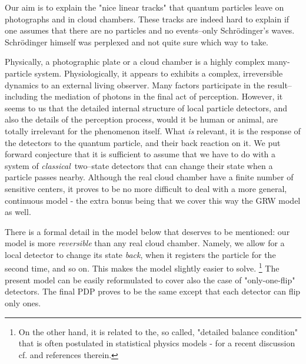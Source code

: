 \documentclass[12pt]{article}
\begin{document}
Our aim is to explain the "nice linear tracks" that quantum particles leave
on photographs and in cloud chambers. These tracks are indeed hard to
explain if one assumes that there are no particles and no events--only
Schr\"odinger's waves. Schr\"odinger himself was perplexed and not quite
sure which way to take.

Physically, a photographic plate or a cloud chamber is a highly complex
many-particle system. Physiologically, it appears to exhibits a complex,
irreversible dynamics to an external living observer. Many factors
participate in the result--including the mediation of photons in the
final act of perception. However, it seems to us that the detailed internal
structure of local particle detectors, and also the details of the
perception process, would it be human or animal, are totally irrelevant for
the phenomenon itself. What {\sl is} relevant, it is the response of the
detectors to the quantum particle, and their back reaction on it. We put
forward conjecture that it is sufficient to assume that we have to do with
a system of {\sl classical}\, two--state detectors that can change their
state when a particle passes nearby. Although the real cloud chamber have a
finite number of sensitive centers, it proves to be no more difficult to
deal with a more general, continuous model - the extra bonus being that we
cover this way the GRW model as well.

There is a formal detail in the model below that deserves to be mentioned:
our model is more {\sl reversible} than any real cloud chamber. Namely, we
allow for a local detector to change its state {\sl back}, when it
registers the particle for the second time, and so on. This makes the model
slightly easier to solve. \footnote{On the other hand, it is related to
the, so called, "detailed balance condition" that is often postulated in
statistical physics models - for a recent discussion cf. \cite{stree1} and
references therein.} The present model can be easily reformulated to cover
also the case of "only-one-flip" detectors. The final PDP proves to be the
same except that each detector can flip only ones.
\end{document}
